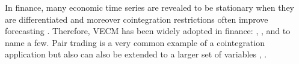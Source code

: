 In finance, many economic time series are revealed to be stationary when they
are differentiated and moreover cointegration restrictions often improve
forecasting \cite{duy1998}. Therefore, VECM has been widely adopted in finance:
\cite{mukherjee1995}, \cite{maysami2000}, \cite{arestis2001} and
\cite{seong2013} to name a few. Pair trading is a very common example of a
cointegration application \cite{herlemont2003} but also can also be extended to
a larger set of variables \cite{mukherjee1995}, \cite{engle2004}.

